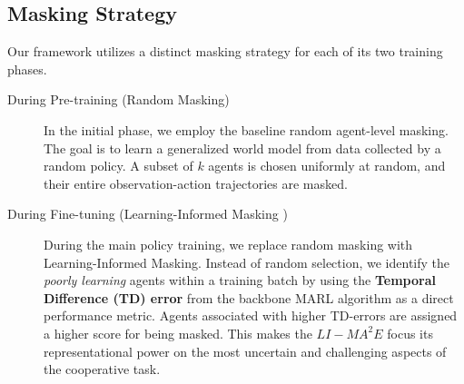 \subsection{Masking Strategy}
Our framework utilizes a distinct masking strategy for each of its two training phases.
\begin{description}
    \item[During Pre-training (Random Masking)] In the initial phase, we employ the baseline random agent-level masking. The goal is to learn a generalized world model from data collected by a random policy. A subset of $k$ agents is chosen uniformly at random, and their entire observation-action trajectories are masked.
    
    
    \item[During Fine-tuning (Learning-Informed Masking )]  During the main policy training, we replace random masking with  Learning-Informed Masking. Instead of random selection, we identify the \textit{poorly learning} agents within a training batch by using the \textbf{Temporal Difference (TD) error} from the backbone MARL algorithm as a direct performance metric. Agents associated with higher TD-errors are assigned a higher score for being masked. This makes the $LI-{MA}^2E$ focus its representational power on the most uncertain and challenging aspects of the cooperative task.
\end{description}


